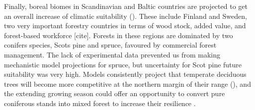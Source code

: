 \documentclass[11pt,letter]{article}
\begin{document}
Finally, boreal biomes in Scandinavian and Baltic countries are projected to get an overall increase of climatic suitability (). These include Finland and Sweden, two very important forestry countries in terms of wood stock, added value, and forest-based workforce [cite].
Forests in these regions are dominated by two conifers species, Scots pine and spruce, favoured by commercial forest management. The lack of experimental data prevented us from making mechanistic model projections for spruce, but uncertainty for Scot pine future suitability was very high. Models consistently project that temperate deciduous trees will become more competitive at the northern margin of their range (), and the extending growing season could offer an opportunity to convert pure coniferous stands into mixed forest to increase their resilience \citep{Schauer2023}.


\clearpage
\end{document}
